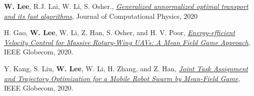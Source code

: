 \begin{cvparagraph}
\begin{cvitems}
    \item \textbf{W. Lee}, R.J. Lai, W. Li, S. Osher., \href{https://www.researchgate.net/publication/338990122_Generalized_Unnormalized_Optimal_Transport_and_its_fast_algorithms}{\textit{Generalized unnormalized optimal transport and its fast algorithms}}, {Journal of Computational Physics}, 2020
    \item H. Gao, \textbf{W. Lee}, W. Li, Z. Han, S. Osher, and H. V. Poor, \href{ftp://ftp.math.ucla.edu/pub/camreport/cam19-57.pdf}{\textit{Energy-efficient Velocity Control for Massive Rotary-Wing UAVs: A Mean Field Game Approach}}, {IEEE Globecom}, 2020.
    \item Y. Kang, S. Liu, \textbf{W. Lee}, W. Li, H. Zhang, and Z. Han, \href{https://ieeexplore.ieee.org/document/9322422}{\textit{Joint Task Assignment and Trajectory Optimization for a Mobile Robot Swarm by Mean-Field Game}}, {IEEE Globecom}, 2020.
  \end{cvitems}
\end{cvparagraph}
